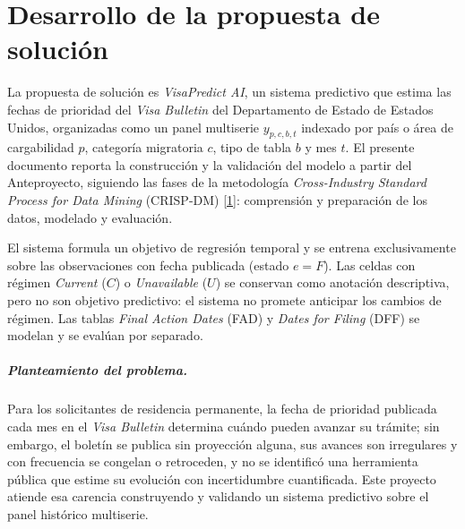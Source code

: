 \documentclass[12pt,letterpaper]{report}
\newcommand{\cita}[1]{\hyperref[bib:#1]{[#1]}}
\begin{document}
\clearpage

\setlength{\parskip}{0pt}
\tableofcontents
\begingroup
\renewcommand{\addvspace}[1]{}
\listoffigures
\listoftables
\endgroup
\setlength{\parskip}{0.4em}
\clearpage

\chapter{Desarrollo de la propuesta de solución}

La propuesta de solución es \textit{VisaPredict AI}, un sistema predictivo que
estima las fechas de prioridad del \textit{Visa Bulletin} del Departamento de
Estado de Estados Unidos, organizadas como un panel multiserie
$y_{p,c,b,t}$ indexado por país o área de cargabilidad $p$, categoría migratoria
$c$, tipo de tabla $b$ y mes $t$. El presente documento reporta la construcción y
la validación del modelo a partir del Anteproyecto, siguiendo las fases de la
metodología \textit{Cross-Industry Standard Process for Data Mining} (CRISP-DM)
\cita{1}: comprensión y preparación de los datos, modelado y evaluación.

El sistema formula un objetivo de regresión temporal y se entrena exclusivamente sobre
las observaciones con fecha publicada (estado $e=F$). Las celdas con régimen
\textit{Current} ($C$) o \textit{Unavailable} ($U$) se conservan como anotación
descriptiva, pero no son objetivo predictivo: el sistema no promete anticipar los
cambios de régimen. Las tablas \textit{Final Action Dates} (FAD) y \textit{Dates
for Filing} (DFF) se modelan y se evalúan por separado.

\paragraph{Planteamiento del problema.} Para los solicitantes de residencia permanente, la
fecha de prioridad publicada cada mes en el \textit{Visa Bulletin} determina cuándo pueden
avanzar su trámite; sin embargo, el boletín se publica sin proyección alguna, sus avances
son irregulares y con frecuencia se congelan o retroceden, y no se identificó una
herramienta pública que estime su evolución con incertidumbre cuantificada. Este proyecto
atiende esa carencia construyendo y validando un sistema predictivo sobre el panel histórico
multiserie.
\end{document}
